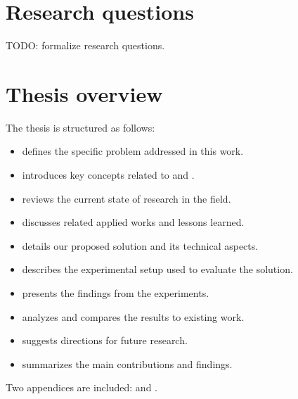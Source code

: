 \section{Research questions}

TODO: formalize research questions.

\section{Thesis overview}

The thesis is structured as follows:

\begin{itemize}
    \item {} defines the specific problem addressed in this work.
    \item {} introduces key concepts related to  and .
    \item {} reviews the current state of research in the field.
    \item {} discusses related applied works and lessons learned.
    \item {} details our proposed solution and its technical aspects.
    \item {} describes the experimental setup used to evaluate the solution.
    \item {} presents the findings from the experiments.
    \item {} analyzes and compares the results to existing work.
    \item {} suggests directions for future research.
    \item {} summarizes the main contributions and findings.
\end{itemize}

Two appendices are included:  and .

